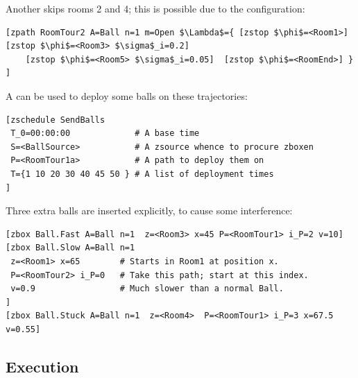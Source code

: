 Another  skips rooms 2 and 4; this is possible due to the  configuration:
\begin{lstlisting}[mathescape]
[zpath RoomTour2 A=Ball n=1 m=Open $\Lambda$={ [zstop $\phi$=<Room1>] [zstop $\phi$=<Room3> $\sigma$_i=0.2]
    [zstop $\phi$=<Room5> $\sigma$_i=0.05]  [zstop $\phi$=<RoomEnd>] } ]
\end{lstlisting}
A  can be used to deploy some balls on these trajectories:
\begin{lstlisting}[mathescape]
[zschedule SendBalls
 T_0=00:00:00             # A base time
 S=<BallSource>           # A zsource whence to procure zboxen
 P=<RoomTour1a>           # A path to deploy them on
 T={1 10 20 30 40 45 50 } # A list of deployment times
]
\end{lstlisting}
Three extra balls are inserted explicitly, to cause some interference:
\begin{lstlisting}[mathescape]
[zbox Ball.Fast A=Ball n=1  z=<Room3> x=45 P=<RoomTour1> i_P=2 v=10]
[zbox Ball.Slow A=Ball n=1 
 z=<Room1> x=65        # Starts in Room1 at position x.
 P=<RoomTour2> i_P=0   # Take this path; start at this index.
 v=0.9                 # Much slower than a normal Ball.
]
[zbox Ball.Stuck A=Ball n=1  z=<Room4>  P=<RoomTour1> i_P=3 x=67.5 v=0.55] 
\end{lstlisting}

\subsection{Execution}

